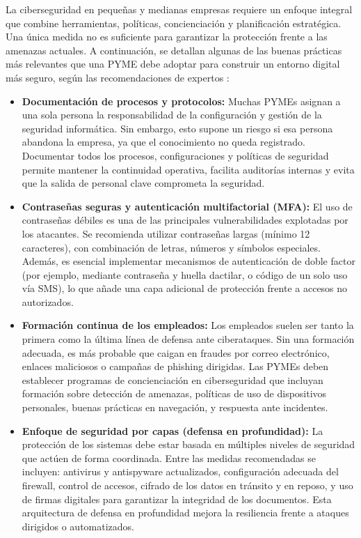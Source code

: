 \documentclass[a4paper, 11pt]{article}
\begin{document}
La ciberseguridad en pequeñas y medianas empresas requiere un enfoque integral que combine herramientas, políticas, concienciación y planificación estratégica. Una única medida no es suficiente para garantizar la protección frente a las amenazas actuales. A continuación, se detallan algunas de las buenas prácticas más relevantes que una PYME debe adoptar para construir un entorno digital más seguro, según las recomendaciones de expertos \cite{toms2021}:

\begin{itemize}
    
    \item \textbf{Documentación de procesos y protocolos:}  
    Muchas PYMEs asignan a una sola persona la responsabilidad de la configuración y gestión de la seguridad informática. Sin embargo, esto supone un riesgo si esa persona abandona la empresa, ya que el conocimiento no queda registrado. Documentar todos los procesos, configuraciones y políticas de seguridad permite mantener la continuidad operativa, facilita auditorías internas y evita que la salida de personal clave comprometa la seguridad.

    \item \textbf{Contraseñas seguras y autenticación multifactorial (MFA):}  
    El uso de contraseñas débiles es una de las principales vulnerabilidades explotadas por los atacantes. Se recomienda utilizar contraseñas largas (mínimo 12 caracteres), 
    con combinación de letras, números y símbolos especiales. Además, es esencial implementar mecanismos de autenticación de doble factor (por ejemplo, mediante contraseña y huella dactilar, o código de un solo uso vía SMS), lo que añade una capa adicional de protección frente a accesos no autorizados.

    \item \textbf{Formación continua de los empleados:}  
    Los empleados suelen ser tanto la primera como la última línea de defensa ante ciberataques. Sin una formación adecuada, es más probable que caigan en fraudes por correo electrónico, 
    enlaces maliciosos o campañas de phishing dirigidas. Las PYMEs deben establecer programas de concienciación en ciberseguridad que incluyan formación sobre detección de amenazas, políticas de uso de dispositivos personales, buenas prácticas en navegación, y respuesta ante incidentes.

    \item \textbf{Enfoque de seguridad por capas (defensa en profundidad):}  
    La protección de los sistemas debe estar basada en múltiples niveles de seguridad que actúen de forma coordinada. Entre las medidas recomendadas se incluyen: 
    antivirus y antispyware actualizados, configuración adecuada del firewall, control de accesos, cifrado de los datos en tránsito y en reposo, y uso de firmas digitales para garantizar la integridad de los documentos. Esta arquitectura de defensa en profundidad mejora la resiliencia frente a ataques dirigidos o automatizados.


\end{itemize}
\end{document}
